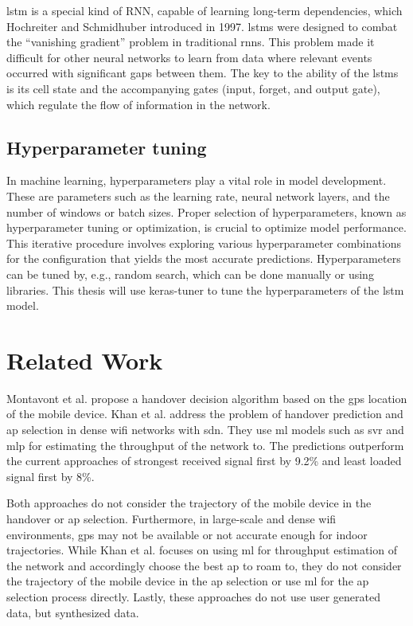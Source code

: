 \ac{lstm} is a special kind of RNN, capable of learning long-term dependencies, which Hochreiter and Schmidhuber introduced in 1997\cite{lstm-hochreiter}.
\acp{lstm} were designed to combat the ``vanishing gradient'' problem in traditional \acp{rnn}. 
This problem made it difficult for other neural networks to learn from data where relevant events occurred with significant gaps between them.
The key to the ability of the \acp{lstm} is its cell state and the accompanying gates (input, forget, and output gate), which regulate the flow of information in the network.


\subsection{Hyperparameter tuning}

In machine learning, hyperparameters play a vital role in model development.
These are parameters such as the learning rate, neural network layers, and the number of windows or batch sizes.
Proper selection of hyperparameters, known as hyperparameter tuning or optimization, is crucial to optimize model performance.
This iterative procedure involves exploring various hyperparameter combinations for the configuration that yields the most accurate predictions.
Hyperparameters can be tuned by, e.g., random search, which can be done manually or using libraries.
This thesis will use keras-tuner\cite{keras_tuner} to tune the hyperparameters of the \ac{lstm} model.


\section{Related Work}

Montavont et al. \cite{handover-assisted-by-gps} propose a handover decision algorithm based on the \ac{gps} location of the mobile device.
Khan et al. \cite{MLBasedHandoverPrediction2022} address the problem of handover prediction and \ac{ap} selection in dense \ac{wifi} networks with \ac{sdn}.
They use \ac{ml} models such as \ac{svr} and \ac{mlp} for estimating the throughput of the network to.
The predictions outperform the current approaches of strongest received signal first by 9.2\% and least loaded signal first by 8\%.

Both approaches do not consider the trajectory of the mobile device in the handover or \ac{ap} selection.
Furthermore, in large-scale and dense \ac{wifi} environments, \ac{gps} may not be available or not accurate enough for indoor trajectories.
While Khan et al. focuses on using \ac{ml} for throughput estimation of the network and accordingly choose the best \ac{ap} to roam to, they do not consider the trajectory of the mobile device in the \ac{ap} selection or use \ac{ml} for the \ac{ap} selection process directly.
Lastly, these approaches do not use user generated data, but synthesized data.

